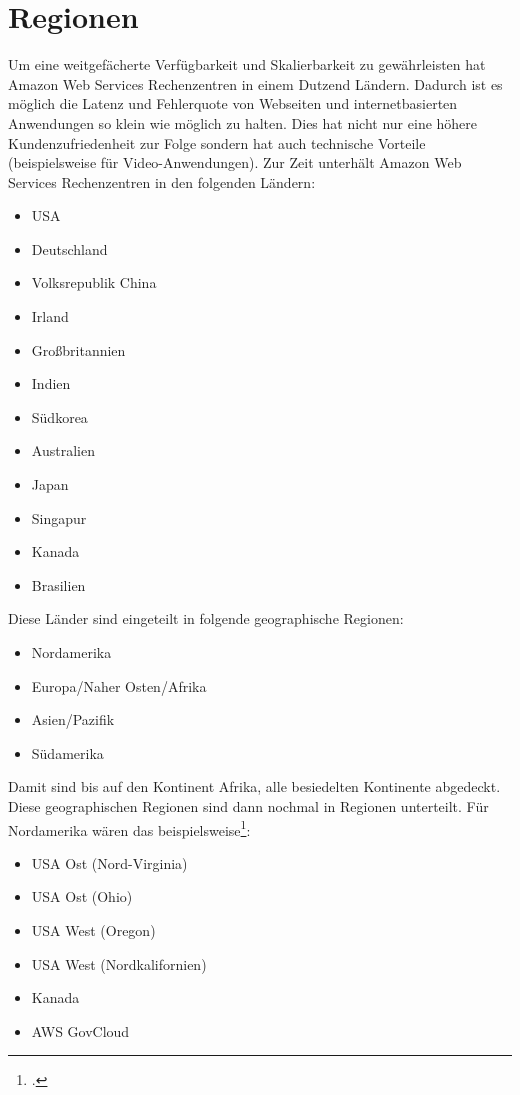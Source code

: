 \documentclass[titlepage]{report}
\begin{document}
\section*{Regionen}
Um eine weitgefächerte Verfügbarkeit und Skalierbarkeit zu gewährleisten
hat Amazon Web Services Rechenzentren in einem Dutzend Ländern. Dadurch
ist es möglich die Latenz und Fehlerquote von Webseiten und internetbasierten
Anwendungen so klein wie möglich zu halten. Dies hat nicht nur eine
höhere Kundenzufriedenheit zur Folge sondern hat auch technische
Vorteile (beispielsweise für Video\hyp{}Anwendungen). Zur Zeit unterhält
Amazon Web Services Rechenzentren in den folgenden Ländern:
\begin{itemize}
    \item USA
    \item Deutschland
    \item Volksrepublik China
    \item Irland
    \item Großbritannien
    \item Indien
    \item Südkorea
    \item Australien
    \item Japan
    \item Singapur
    \item Kanada
    \item Brasilien
\end{itemize}
Diese Länder sind eingeteilt in folgende geographische Regionen:
\begin{itemize}
    \item Nordamerika
    \item Europa/Naher Osten/Afrika
    \item Asien/Pazifik
    \item Südamerika
\end{itemize}
Damit sind bis auf den Kontinent Afrika, alle besiedelten Kontinente
abgedeckt. Diese geographischen Regionen sind dann nochmal in Regionen
unterteilt. Für Nordamerika wären das beispielsweise\footcite{region}:
\begin{itemize}
    \item USA Ost (Nord\hyp{}Virginia)
    \item USA Ost (Ohio)
    \item USA West (Oregon)
    \item USA West (Nordkalifornien)
    \item Kanada
    \item AWS GovCloud
\end{itemize}
\end{document}
